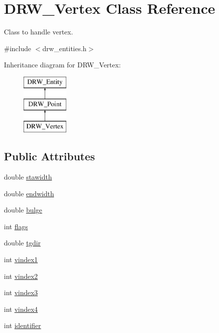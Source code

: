 \hypertarget{class_d_r_w___vertex}{}\section{D\+R\+W\+\_\+\+Vertex Class Reference}
\label{class_d_r_w___vertex}


Class to handle vertex.  




{\ttfamily \#include $<$drw\+\_\+entities.\+h$>$}

Inheritance diagram for D\+R\+W\+\_\+\+Vertex\+:\begin{figure}[H]
\begin{center}
\leavevmode
\includegraphics[height=3.000000cm]{df/dc7/class_d_r_w___vertex}
\end{center}
\end{figure}
\subsection*{Public Attributes}
\begin{DoxyCompactItemize}
\item 
double \hyperlink{class_d_r_w___vertex_a59c2c6a18ec24afdec344b187cb89e02}{stawidth}
\item 
double \hyperlink{class_d_r_w___vertex_a707f8fca7c9df740d9a13b1328c05d06}{endwidth}
\item 
double \hyperlink{class_d_r_w___vertex_ace756c96a4ff61eb15e7e1327d7fc56d}{bulge}
\item 
int \hyperlink{class_d_r_w___vertex_a662134a0aaac672cbb37c741e872ce3a}{flags}
\item 
double \hyperlink{class_d_r_w___vertex_ab94318addec1b5ca507a11cf8dd04b34}{tgdir}
\item 
int \hyperlink{class_d_r_w___vertex_aff58612a8e14eb93c6c7667fa19f087b}{vindex1}
\item 
int \hyperlink{class_d_r_w___vertex_a48f459a7d3627c898fa9e1be5b0de6d6}{vindex2}
\item 
int \hyperlink{class_d_r_w___vertex_a43d78abe4c3bacad98ef2a65216e225e}{vindex3}
\item 
int \hyperlink{class_d_r_w___vertex_a1f2c2a799721fe8e6290c6121c190ad8}{vindex4}
\item 
int \hyperlink{class_d_r_w___vertex_a14a4b517273a6c76a5b905eb691d5193}{identifier}
\end{DoxyCompactItemize}
